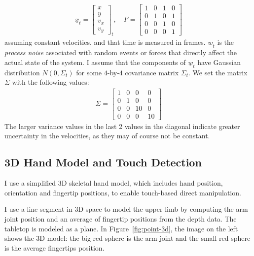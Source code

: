 \begin{align*}
\underline{x}_t = \begin{bmatrix}
  x   \\
  y   \\
  v_x \\
  v_y \end{bmatrix}_t, \quad
F = \begin{bmatrix}
  1 & 0 & 1 & 0 \\
  0 & 1 & 0 & 1 \\
  0 & 0 & 1 & 0 \\
  0 & 0 & 0 & 1 \end{bmatrix}
\end{align*}
assuming constant velocities, and that time is measured in frames.
$\underline{w}_t$ is the \textit{process noise} associated with random events or
forces that directly affect the actual state of the system. I assume that the 
components of $\underline{w}_t$ have Gaussian distribution $N(\underline{0},
\Sigma_t)$ for some $4$-by-$4$ covariance matrix $\Sigma_t$. We set the matrix $\Sigma$ with the
following values:
\begin{align*}
\Sigma = \begin{bmatrix}
  1 & 0 & 0 & 0 \\
  0 & 1 & 0 & 0 \\
  0 & 0 & 10 & 0 \\
  0 & 0 & 0 & 10 
  \end{bmatrix}
\end{align*}
The larger variance values in the last 2 values in the diagonal indicate
greater uncertainty in the velocities, as they may of course not be constant.

\subsection{3D Hand Model and Touch Detection}
I use a simplified 3D
skeletal hand model, which includes hand position, orientation and
fingertip positions, to enable touch-based direct manipulation. 

I use a line segment in 3D space to model the upper limb by computing the arm
joint position and an average of fingertip positions from the depth data. The
tabletop is modeled as a plane. In Figure~\ref{fig:point-3d}, the image on the
left shows the 3D model: the big red sphere is the arm joint and the small red
sphere is the average fingertips position. 

